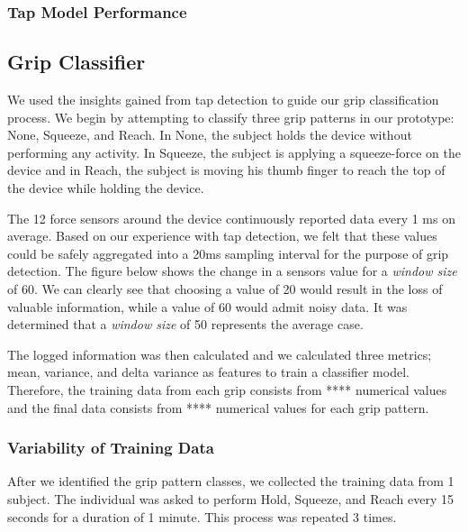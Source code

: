 \subsubsection{Tap Model Performance}







\subsection{Grip Classifier}
We used the insights gained from tap detection to guide our grip classification process. We begin by attempting to classify three grip patterns in our prototype: None, Squeeze, and Reach. In None, the subject holds the device without performing any activity. In Squeeze, the subject is applying a squeeze-force on the device and in Reach, the subject is moving his thumb finger to reach the top of the device while holding the device.  
\par
The 12 force sensors around the device continuously reported data every 1 ms on average. Based on our experience with tap detection, we felt that these values could be safely aggregated into a 20ms sampling interval for the purpose of grip detection. The figure below 
shows the change in a sensors value for a \textit{window size} of 60. We can clearly see that choosing a value of 20 would result in the loss of valuable information, while a value of 60 would admit noisy data. It was determined that a \textit{window size} of 50 represents the average case.

 The logged information was then calculated  and we calculated three metrics; mean, variance, and delta variance as features to train a classifier model. Therefore, the training data from each grip consists from **** numerical values and the final data consists from **** numerical values for each grip pattern.

\subsubsection{Variability of Training Data}
After we identified the grip pattern classes, we collected the training data from 1 subject. The individual was asked to perform Hold, Squeeze, and Reach every 15 seconds for a duration of 1 minute. This process was repeated 3 times.

